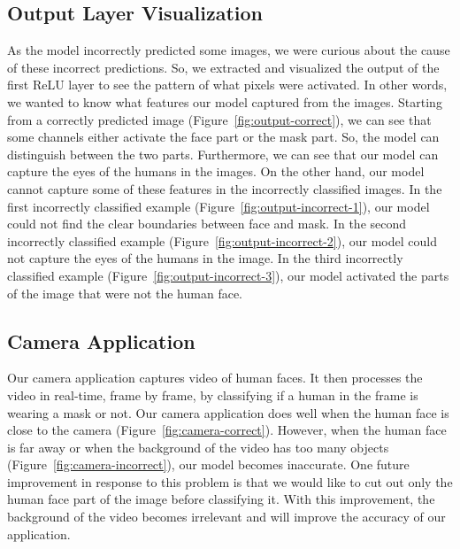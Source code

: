 \subsection{Output Layer Visualization}

As the model incorrectly predicted some images, we were curious about the cause of these incorrect predictions.
So, we extracted and visualized the output of the first ReLU layer to see the pattern of what pixels were activated.
In other words, we wanted to know what features our model captured from the images.
Starting from a correctly predicted image (Figure~\ref{fig:output-correct}), we can see that some channels either activate the face part or the mask part.
So, the model can distinguish between the two parts.
Furthermore, we can see that our model can capture the eyes of the humans in the images.
On the other hand, our model cannot capture some of these features in the incorrectly classified images.
In the first incorrectly classified example (Figure~\ref{fig:output-incorrect-1}), our model could not find the clear boundaries between face and mask.
In the second incorrectly classified example (Figure~\ref{fig:output-incorrect-2}), our model could not capture the eyes of the humans in the image.
In the third incorrectly classified example (Figure~\ref{fig:output-incorrect-3}), our model activated the parts of the image that were not the human face.


\subsection{Camera Application}
Our camera application captures video of human faces.
It then processes the video in real-time, frame by frame, by classifying if a human in the frame is wearing a mask or not.
Our camera application does well when the human face is close to the camera (Figure~\ref{fig:camera-correct}).
However, when the human face is far away or when the background of the video has too many objects (Figure~\ref{fig:camera-incorrect}), our model becomes inaccurate.
One future improvement in response to this problem is that we would like to cut out only the human face part of the image before classifying it.
With this improvement, the background of the video becomes irrelevant and will improve the accuracy of our application.
